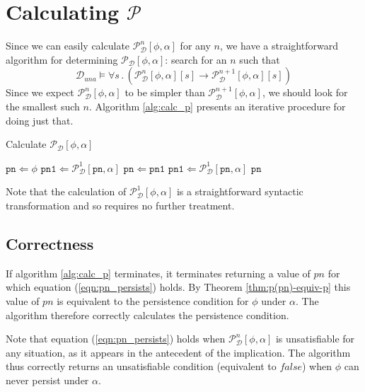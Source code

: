 \section{Calculating $\mathcal{P}$}

Since we can easily calculate $\mathcal{P}_{\mathcal{D}}^{n}[\phi,\alpha]$
for any $n$, we have a straightforward algorithm for determining
$\mathcal{P_{D}}[\phi,\alpha]$: search for an $n$ such that\[
\mathcal{D}_{una}\models\forall s\,.\,\left(\mathcal{P}_{\mathcal{D}}^{n}[\phi,\alpha][s]\rightarrow\mathcal{P}_{\mathcal{D}}^{n+1}[\phi,\alpha][s]\right)\]
 Since we expect $\mathcal{P}_{\mathcal{D}}^{n}[\phi,\alpha]$ to
be simpler than $\mathcal{P}_{\mathcal{D}}^{n+1}[\phi,\alpha]$, we
should look for the smallest such $n$. Algorithm \ref{alg:calc_p}
presents an iterative procedure for doing just that.

%
\begin{algorithm}
\caption{Calculate $\mathcal{P}_{\mathcal{D}}[\phi,\alpha]$}


\label{alg:calc_p} \begin{algorithmic} \STATE $\mathtt{pn}\Leftarrow\phi$
\STATE $\mathtt{pn1}\Leftarrow\mathcal{P}_{\mathcal{D}}^{1}[\mathtt{pn},\alpha]$
\STATE $\mathtt{pn}\Leftarrow\mathtt{pn1}$ \STATE $\mathtt{pn1}\Leftarrow\mathcal{P}_{\mathcal{D}}^{1}[\mathtt{pn},\alpha]$
\ENDWHILE \RETURN $\mathtt{pn}$ \end{algorithmic} 
\end{algorithm}


Note that the calculation of $\mathcal{P}_{\mathcal{D}}^{1}[\phi,\alpha]$
is a straightforward syntactic transformation and so requires no further
treatment.


\subsection{Correctness}

If algorithm \ref{alg:calc_p} terminates, it terminates returning
a value of $pn$ for which equation (\ref{eqn:pn_persists}) holds.
By Theorem \ref{thm:p(pn)-equiv-p} this value of $pn$ is equivalent
to the persistence condition for $\phi$ under $\alpha$. The algorithm
therefore correctly calculates the persistence condition.

Note that equation (\ref{eqn:pn_persists}) holds when $\mathcal{P}_{\mathcal{D}}^{n}[\phi,\alpha]$
is unsatisfiable for any situation, as it appears in the antecedent
of the implication. The algorithm thus correctly returns an unsatisfiable
condition (equivalent to $false$) when $\phi$ can never persist
under $\alpha$.


